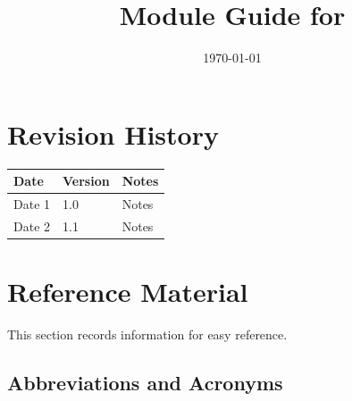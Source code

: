 \documentclass[12pt, titlepage]{article}
\begin{document}
\title{Module Guide for \progname{}}
\author{\authname}
\date{\today}

\maketitle


\section{Revision History}

\begin{tabularx}{\textwidth}{p{3cm}p{2cm}X}
  \toprule {\bf Date} & {\bf Version} & {\bf Notes} \\
  \midrule
  Date 1              & 1.0           & Notes       \\
  Date 2              & 1.1           & Notes       \\
  \bottomrule
\end{tabularx}

\newpage

\section{Reference Material}

This section records information for easy reference.

\subsection{Abbreviations and Acronyms}
\end{document}
